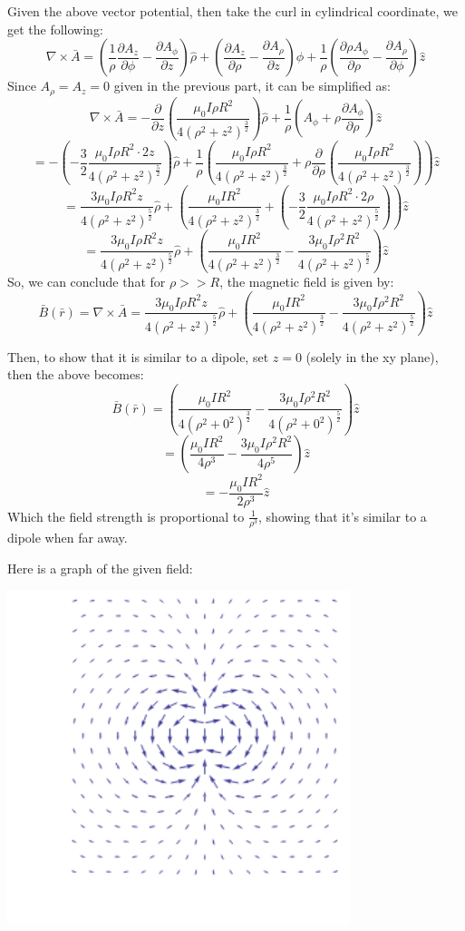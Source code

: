 \documentclass{article}
\begin{document}
Given the above vector potential, then take the curl in cylindrical coordinate, we get the following:
$$\nabla\times \bar{A}=\left(\frac{1}{\rho}\frac{\partial A_z}{\partial \phi}-\frac{\partial A_\phi}{\partial z}\right)\hat{\rho}+\left(\frac{\partial A_z}{\partial \rho}-\frac{\partial A_\rho}{\partial z}\right)\hat{\phi}+\frac{1}{\rho}\left(\frac{\partial \rho A_\phi}{\partial \rho}-\frac{\partial A_\rho}{\partial \phi}\right)\hat{z}$$
Since $A_\rho=A_z=0$ given in the previous part, it can be simplified as:
$$\nabla\times \bar{A}=-\frac{\partial}{\partial z}\left(\frac{\mu_0I\rho R^2}{4(\rho^2+z^2)^\frac{3}{2}}\right)\hat{\rho}+\frac{1}{\rho}\left(A_\phi+\rho\frac{\partial A_\phi}{\partial \rho}\right)\hat{z}$$
$$=-\left(-\frac{3}{2}\frac{\mu_0I\rho R^2\cdot 2z}{4(\rho^2+z^2)^\frac{5}{2}}\right)\hat{\rho}+\frac{1}{\rho}\left(\frac{\mu_0I\rho R^2}{4(\rho^2+z^2)^\frac{3}{2}}+\rho \frac{\partial}{\partial \rho}\left(\frac{\mu_0I\rho R^2}{4(\rho^2+z^2)^\frac{3}{2}}\right)\right)\hat{z}$$
$$=\frac{3\mu_0I\rho R^2z}{4(\rho^2+z^2)^\frac{5}{2}}\hat{\rho}+\left(\frac{\mu_0IR^2}{4(\rho^2+z^2)^{\frac{3}{2}}}+\left(-\frac{3}{2}\frac{\mu_0I\rho R^2\cdot 2\rho}{4(\rho^2+z^2)^{\frac{5}{2}}}\right)\right)\hat{z}$$
$$=\frac{3\mu_0I\rho R^2z}{4(\rho^2+z^2)^\frac{5}{2}}\hat{\rho}+\left(\frac{\mu_0IR^2}{4(\rho^2+z^2)^{\frac{3}{2}}}-\frac{3\mu_0I\rho^2 R^2}{4(\rho^2+z^2)^{\frac{5}{2}}}\right)\hat{z}$$
So, we can conclude that for $\rho >> R$, the magnetic field is given by:
$$\bar{B}(\bar{r})=\nabla\times \bar{A}=\frac{3\mu_0I\rho R^2z}{4(\rho^2+z^2)^\frac{5}{2}}\hat{\rho}+\left(\frac{\mu_0IR^2}{4(\rho^2+z^2)^{\frac{3}{2}}}-\frac{3\mu_0I\rho^2 R^2}{4(\rho^2+z^2)^{\frac{5}{2}}}\right)\hat{z}$$

Then, to show that it is similar to a dipole, set $z=0$ (solely in the xy plane), then the above becomes:
$$\bar{B}(\bar{r})=\left(\frac{\mu_0IR^2}{4(\rho^2+0^2)^{\frac{3}{2}}}-\frac{3\mu_0I\rho^2 R^2}{4(\rho^2+0^2)^{\frac{5}{2}}}\right)\hat{z}$$
$$=\left(\frac{\mu_0IR^2}{4\rho^3}-\frac{3\mu_0I\rho^2R^2}{4\rho^5}\right)\hat{z}$$
$$=-\frac{\mu_0IR^2}{2\rho^3}\hat{z}$$
Which the field strength is proportional to $\frac{1}{\rho^3}$, showing that it's similar to a dipole when far away.

\hfill

Here is a graph of the given field:

\begin{center}
    \includegraphics*[width=100mm]{dipole.png}
\end{center}
\end{document}
